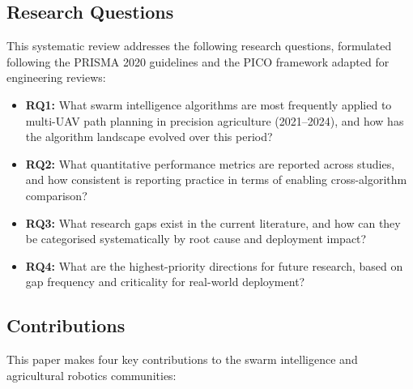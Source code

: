 \documentclass[review,3p,times]{elsarticle}
\begin{document}
\subsection{Research Questions}

This systematic review addresses the following research questions, formulated following the PRISMA 2020 guidelines \cite{page2021} and the PICO framework adapted for engineering reviews:

\begin{itemize}
  \item \textbf{RQ1:} What swarm intelligence algorithms are most frequently applied to multi-UAV path planning in precision agriculture (2021--2024), and how has the algorithm landscape evolved over this period?
  \item \textbf{RQ2:} What quantitative performance metrics are reported across studies, and how consistent is reporting practice in terms of enabling cross-algorithm comparison?
  \item \textbf{RQ3:} What research gaps exist in the current literature, and how can they be categorised systematically by root cause and deployment impact?
  \item \textbf{RQ4:} What are the highest-priority directions for future research, based on gap frequency and criticality for real-world deployment?
\end{itemize}

\subsection{Contributions}

This paper makes four key contributions to the swarm intelligence and agricultural robotics communities:
\end{document}
